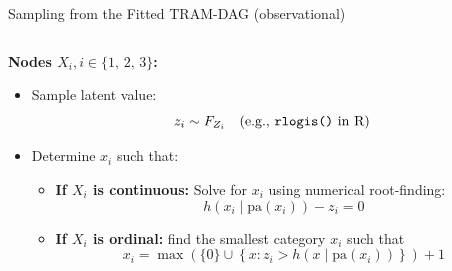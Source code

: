 \documentclass[onlytextwidth,english]{beamer}\usepackage[]{graphicx}\usepackage[]{xcolor}
\begin{document}
\begin{frame}{Sampling from the Fitted TRAM-DAG (observational)}

\begin{columns}

\begin{column}{0.65\textwidth}

\textbf{Nodes $X_i , i \in \{1,\, 2,\, 3\}$:}

\vspace{0.2cm}

\begin{itemize}
    \item Sample latent value: 
    \[
    z_i \sim F_{Z_i} \quad \text{(e.g., \texttt{rlogis()} in R)}
    \]

    \item Determine \(x_i\) such that:

    \begin{itemize}
        \item \textbf{If \(X_i\) is continuous:}
        Solve for \(x_i\) using numerical root-finding:
        \[
        h(x_i \mid \text{pa}(x_i)) - z_i = 0
        \]
        \item \textbf{If \(X_i\) is ordinal:}
        find the smallest category $x_i$ such that
        \[
        x_i = \max \left( \{0\} \cup \left\{ x : z_i > h(x \mid \text{pa}(x_i)) \right\} \right) + 1
        \]
        
    \end{itemize}
\end{itemize}

\end{column}


\end{columns}
\end{frame}
\end{document}
